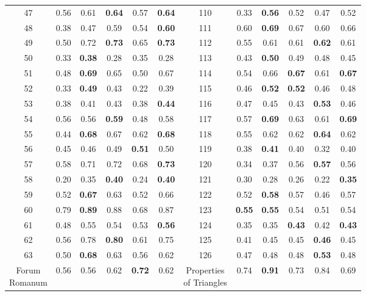 \documentclass{article}
\begin{document}
{\begin{longtable}{cccccc@{\qquad}cccccc}
47 & 0.56 & 0.61 & \textbf{0.64} & 0.57 & \textbf{0.64} & 110 & 0.33 & \textbf{0.56} & 0.52 & 0.47 & 0.52 \\
48 & 0.38 & 0.47 & 0.59 & 0.54 & \textbf{0.60} & 111 & 0.60 & \textbf{0.69} & 0.67 & 0.60 & 0.66 \\
49 & 0.50 & 0.72 & \textbf{0.73} & 0.65 & \textbf{0.73} & 112 & 0.55 & 0.61 & 0.61 & \textbf{0.62} & 0.61 \\
50 & 0.33 & \textbf{0.38} & 0.28 & 0.35 & 0.28 & 113 & 0.43 & \textbf{0.50} & 0.49 & 0.48 & 0.45 \\
51 & 0.48 & \textbf{0.69} & 0.65 & 0.50 & 0.67 & 114 & 0.54 & 0.66 & \textbf{0.67} & 0.61 & \textbf{0.67} \\
52 & 0.33 & \textbf{0.49} & 0.43 & 0.22 & 0.39 & 115 & 0.46 & \textbf{0.52} & \textbf{0.52} & 0.46 & 0.48 \\
53 & 0.38 & 0.41 & 0.43 & 0.38 & \textbf{0.44} & 116 & 0.47 & 0.45 & 0.43 & \textbf{0.53} & 0.46 \\
54 & 0.56 & 0.56 & \textbf{0.59} & 0.48 & 0.58 & 117 & 0.57 & \textbf{0.69} & 0.63 & 0.61 & \textbf{0.69} \\
55 & 0.44 & \textbf{0.68} & 0.67 & 0.62 & \textbf{0.68} & 118 & 0.55 & 0.62 & 0.62 & \textbf{0.64} & 0.62 \\
56 & 0.45 & 0.46 & 0.49 & \textbf{0.51} & 0.50 & 119 & 0.38 & \textbf{0.41} & 0.40 & 0.32 & 0.40 \\
57 & 0.58 & 0.71 & 0.72 & 0.68 & \textbf{0.73} & 120 & 0.34 & 0.37 & 0.56 & \textbf{0.57} & 0.56 \\
58 & 0.20 & 0.35 & \textbf{0.40} & 0.24 & \textbf{0.40} & 121 & 0.30 & 0.28 & 0.26 & 0.22 & \textbf{0.35} \\
59 & 0.52 & \textbf{0.67} & 0.63 & 0.52 & 0.66 & 122 & 0.52 & \textbf{0.58} & 0.57 & 0.46 & 0.57 \\
60 & 0.79 & \textbf{0.89} & 0.88 & 0.68 & 0.87 & 123 & \textbf{0.55} & \textbf{0.55} & 0.54 & 0.51 & 0.54 \\
61 & 0.48 & 0.55 & 0.54 & 0.53 & \textbf{0.56} & 124 & 0.35 & 0.35 & \textbf{0.43} & 0.42 & \textbf{0.43} \\
62 & 0.56 & 0.78 & \textbf{0.80} & 0.61 & 0.75 & 125 & 0.41 & 0.45 & 0.45 & \textbf{0.46} & 0.45 \\
63 & 0.50 & \textbf{0.68} & 0.63 & 0.56 & 0.62 & 126 & 0.47 & 0.48 & 0.48 & \textbf{0.53} & 0.48 \\
\makecell[c]{Forum \\ Romanum} & 0.56 & 0.56 & 0.62 & \textbf{0.72} & 0.62 & \makecell[c]{Properties \\ of Triangles} & 0.74 & \textbf{0.91} & 0.73 & 0.84 & 0.69 \\

\end{longtable}}
\end{document}
